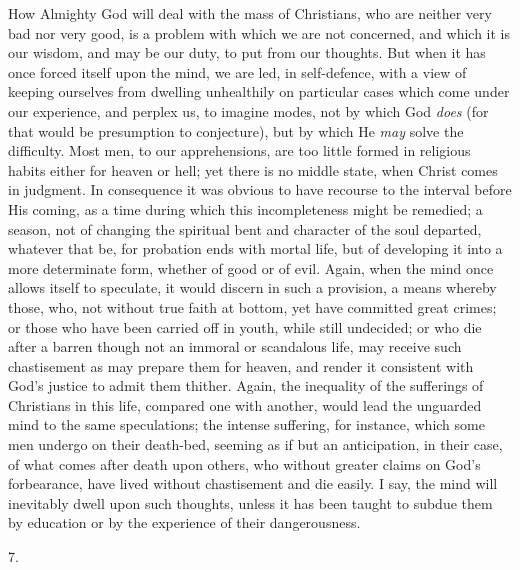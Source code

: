 How Almighty God will deal with the mass of Christians, who are
neither very bad nor very good, is a problem with which we are not
concerned, and which it is our wisdom, and may be our duty, to put
from our thoughts. But when it has once forced itself upon the mind,
we are led, in self-defence, with a view of keeping ourselves from
dwelling unhealthily on particular cases which come under our
experience, and perplex us, to imagine modes, not by which God \emph{does}
(for that would be presumption to conjecture), but by which He \emph{may}
solve the difficulty. Most men, to our apprehensions, are too little
formed in religious habits either for heaven or hell; yet there
is no middle state, when Christ comes in judgment. In consequence it
was obvious to have recourse to the interval before His coming, as a
time during which this incompleteness might be remedied; a season, not
of changing the spiritual bent and character of the soul departed,
whatever that be, for probation ends with mortal life, but of
developing it into a more determinate form, whether of good or of
evil. Again, when the mind once allows itself to speculate, it would
discern in such a provision, a means whereby those, who, not without
true faith at bottom, yet have committed great crimes; or those who
have been carried off in youth, while still undecided; or who die
after a barren though not an immoral or scandalous life, may receive
such chastisement as may prepare them for heaven, and render it
consistent with God's justice to admit them thither. Again, the
inequality of the sufferings of Christians in this life, compared one
with another, would lead the unguarded mind to the same speculations;
the intense suffering, for instance, which some men undergo on their
death-bed, seeming as if but an anticipation, in their case, of what
comes after death upon others, who without greater claims on God's
forbearance, have lived without chastisement and die easily. I say,
the mind will inevitably dwell upon such thoughts, unless it has been
taught to subdue them by education or by the experience of their
dangerousness.

7.

